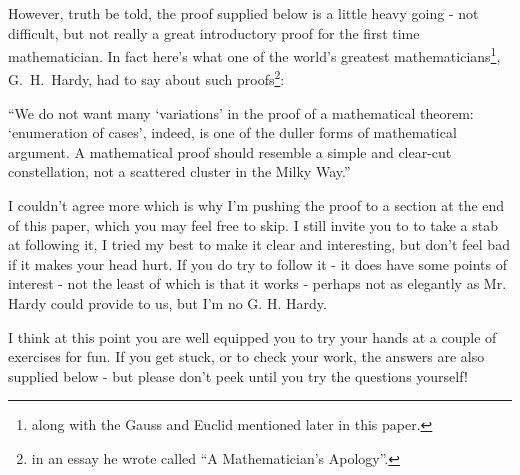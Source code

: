 \documentclass{article}
\newenvironment{jprIn}{\begin{adjustwidth}{2em}{}}{\end{adjustwidth}}
\begin{document}
However, truth be told, the proof supplied below
is a little heavy going - not difficult,
but not really a great introductory proof for the first time mathematician.
In fact here's what one of the
world's greatest mathematicians\footnote{along with the Gauss
and Euclid mentioned later in this paper.},
G.~H.~Hardy, had to say about such
proofs\footnote{in an essay he wrote called ``A Mathematician's Apology''.}:

\begin{jprIn}
``We do not want many `variations' in the proof of a mathematical
theorem: `enumeration of cases', indeed, is one
of the duller forms of mathematical argument. A mathematical proof
should resemble a simple and clear-cut constellation, not a scattered
cluster in the Milky Way.''
\end{jprIn}

I couldn't agree more which is why I'm pushing the proof to
a section at the end of this paper, which you may
feel free to skip.
I still invite you to to take a stab at following it,
I tried my best to make it clear and interesting,
but don't feel bad if it
makes your head hurt. If you do try to follow it - it does
have some points of interest - not the least
of which is that it works - perhaps not as elegantly as
Mr. Hardy could provide to us, but I'm no G. H. Hardy.

I think at this point you are well equipped you to try
your hands at a couple of exercises for fun. If you get stuck, or to
check your work, the
answers are also supplied below - but please don't peek until you try the questions yourself!
\end{document}
